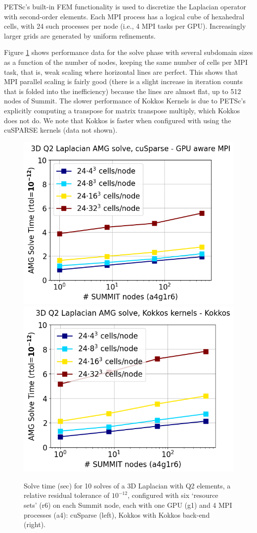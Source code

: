 \documentclass[10pt,journal,compsoc]{IEEEtran}
\begin{document}
PETSc's built-in FEM functionality is used to discretize the Laplacian operator with second-order elements.
Each MPI process has a logical cube of hexahedral cells, with 24 such processes per node (i.e., 4 MPI tasks per GPU).
Increasingly larger grids are generated by uniform refinements.

Figure \ref{fig:gamg_weak_scaling} shows performance data for the solve phase with several subdomain sizes as a function of the number of nodes, keeping the same number of cells per MPI task, that is, weak scaling where horizontal lines are perfect.
This shows that MPI parallel scaling is fairly good (there is a slight increase in iteration counts that is folded into the inefficiency) because the lines are almost flat, up to 512 nodes of Summit.
The slower performance of Kokkos Kernels is due to PETSc's explicitly computing a transpose for matrix transpose multiply, which Kokkos does not do.
We note that Kokkos is faster when configured with using the cuSPARSE kernels (data not shown).

\begin{figure}[htbp]
\begin{center}
\includegraphics[width=.49\linewidth]{weak_scaling_cuda_def_a4g1r6.png}
\includegraphics[width=.49\linewidth]{weak_scaling_kokkos_notpl_a4g1r6.png}
\caption{Solve time (sec) for 10 solves of a 3D Laplacian with Q2 elements, a relative residual tolerance of $10^{-12}$, configured with six  `resource sets' (r6) on each Summit node, each with one GPU (g1) and 4 MPI processes (a4): cuSparse (left), Kokkos with Kokkos back-end (right).}
\label{fig:gamg_weak_scaling}
\end{center}
\end{figure}
\end{document}
